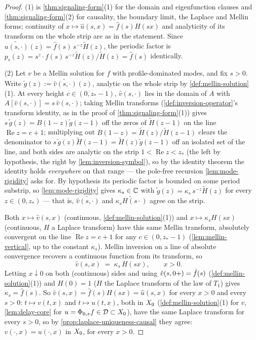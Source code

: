 \begin{proof}
(1) is \ref{thm:signaling-form}(1) for the domain and eigenfunction clauses and
\ref{thm:signaling-form}(2) for causality, the boundary limit, the Laplace and Mellin forms;
continuity of $x \mapsto \hat u(s,x) = \hat f(s)H(sx)$ and analyticity of its transform on the
whole strip are as in the statement. Since $\widetilde{\hat u(s,\cdot)}(z) =
\hat f(s)\,s^{-z}\tilde H(z)$, the periodic factor is
$p_s(z) = s^z\cdot\hat f(s)\,s^{-z}\tilde H(z)/\tilde H(z) = \hat f(s)$ identically.

(2) Let $v$ be a Mellin solution for $f$ with profile-dominated modes, and fix $s > 0$. Write
$\tilde g(z) := \widetilde{\hat v(s,\cdot)}(z)$, analytic on the whole strip by
\ref{def:mellin-solution}(1). At every height $c \in (0,z_*-1)$, $\hat v(s,\cdot)$ lies in the
domain of $A$ with $A[\hat v(s,\cdot)] = s\,\hat v(s,\cdot)$; taking Mellin transforms
(\ref{def:inversion-operator}'s transform identity, as in the proof of \ref{thm:signaling-form}(1))
gives $s\,\tilde g(z) = B(1-z)\tilde g(z-1)$ off the zeros of $\tilde H(z-1)$ on the line
$\operatorname{Re} z = c+1$; multiplying out $B(1-z) = \tilde H(z)/\tilde H(z-1)$ clears the denominator to
$s\,\tilde g(z)\tilde H(z-1) = \tilde H(z)\tilde g(z-1)$ off an isolated set of the line, and both
sides are analytic on the strip $1 < \operatorname{Re} z < z_*$ (the left by hypothesis, the right by
\ref{lem:inversion-symbol}), so by the identity theorem the identity holds \emph{everywhere} on
that range --- the pole-free recursion \ref{lem:mode-rigidity} asks for. By hypothesis its
periodic factor is bounded on some period substrip, so \ref{lem:mode-rigidity} gives
$\kappa_s \in \mathbb{C}$ with $\tilde g(z) = \kappa_s\,s^{-z}\tilde H(z)$ for every $z \in (0,z_*)$ ---
that is, $\widetilde{\hat v(s,\cdot)}$ and $\widetilde{\kappa_s H(s\cdot)}$ agree on the strip.

Both $x \mapsto \hat v(s,x)$ (continuous, \ref{def:mellin-solution}(1)) and
$x \mapsto \kappa_s H(sx)$ (continuous, $H$ a Laplace transform) have this same Mellin transform,
absolutely convergent on the line $\operatorname{Re} z = c+1$ for any $c \in (0,z_*-1)$
(\ref{lem:mellin-vertical}, up to the constant $\kappa_s$). Mellin inversion on a line of absolute
convergence recovers a continuous function from its transform, so
\[
\hat v(s,x) \;=\; \kappa_s\,H(sx), \qquad x > 0.
\]
Letting $x \downarrow 0$ on both (continuous) sides and using $\hat v(s,0{+}) = \hat f(s)$
(\ref{def:mellin-solution}(1)) and $H(0) = 1$ ($H$ the Laplace transform of the law of $T_1$) gives
$\kappa_s = \hat f(s)$. So $\hat v(s,x) = \hat f(s)H(sx) = \hat u(s,x)$ for every $x>0$ and every
$s>0$: $t \mapsto v(t,x)$ and $t \mapsto u(t,x)$, both in $X_0$
(\ref{def:mellin-solution}(1) for $v$, \ref{lem:delay-core} for $u = \Phi_{0,x}f \in \mathcal{D} \subset
X_0$), have the same Laplace transform for every $s>0$, so by \ref{prop:laplace-uniqueness-causal}
they agree: $v(\cdot,x) = u(\cdot,x)$ in $X_0$, for every $x>0$.
\end{proof}

